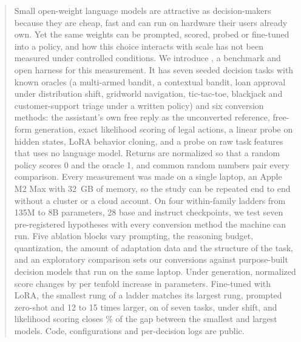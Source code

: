 \begin{abstract}
Small open-weight language models are attractive as decision-makers because they are cheap, fast and can run on hardware their users already own. Yet the same weights can be prompted, scored, probed or fine-tuned into a policy, and how this choice interacts with scale has not been measured under controlled conditions. We introduce \deadeye{}, a benchmark and open harness for this measurement. It has seven seeded decision tasks with known oracles (a multi-armed bandit, a contextual bandit, loan approval under distribution shift, gridworld navigation, tic-tac-toe, blackjack and customer-support triage under a written policy) and six conversion methods: the assistant's own free reply as the unconverted reference, free-form generation, exact likelihood scoring of legal actions, a linear probe on hidden states, LoRA behavior cloning, and a probe on raw task features that uses no language model. Returns are normalized so that a random policy scores 0 and the oracle 1, and common random numbers pair every comparison. Every measurement was made on a single laptop, an Apple M2 Max with 32~GB of memory, so the study can be repeated end to end without a cluster or a cloud account. On four within-family ladders from 135M to 8B parameters, 28 base and instruct checkpoints, we test seven pre-registered hypotheses with every conversion method the machine can run. Five ablation blocks vary prompting, the reasoning budget, quantization, the amount of adaptation data and the structure of the task, and an exploratory comparison sets our conversions against purpose-built decision models that run on the same laptop. Under generation, normalized score changes by \result{[slope $b$, 95\% CI]} per tenfold increase in parameters. Fine-tuned with LoRA, the smallest rung of a ladder matches its largest rung, prompted zero-shot and 12 to 15 times larger, on \result{[k]} of seven tasks,  under shift, and likelihood scoring closes \result{[Z]}\% of the gap between the smallest and largest models. Code, configurations and per-decision logs are public.
\end{abstract}
